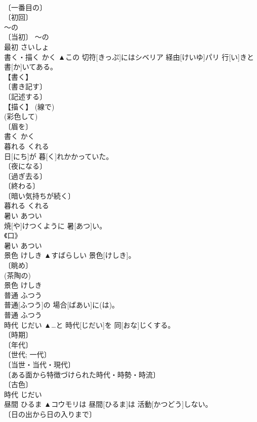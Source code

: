 \documentclass[8pt]{extreport}
\begin{document}
\begin{CJK}{UTF8}{min}
\\	〔一番目の〕 
\\	〔初回〕 
\\	～の 
\\	〔当初〕 ～の 
\\	最初	さいしょ	
\\	書く・描く	かく	▲この 切符[きっぷ]にはシベリア 経由[けいゆ]パリ 行[い]きと 書[か]いてある。	
\\	【書く】 
\\	〔書き記す〕 
\\	〔記述する〕 
\\	【描く】 (線で) 
\\	(彩色して) 
\\	〔眉を〕 
\\	書く	かく	
\\	暮れる	くれる	
\\	日[にち]が 暮[く]れかかっていた。	
\\	〔夜になる〕 
\\	〔過ぎ去る〕 
\\	〔終わる〕 
\\	〔暗い気持ちが続く〕 
\\	暮れる	くれる	
\\	暑い	あつい	
\\	焼[や]けつくように 暑[あつ]い。	
\\	《口》 
\\	暑い	あつい	
\\	景色	けしき	▲すばらしい 景色[けしき]。	
\\	〔眺め〕 
\\	(茶陶の) 
\\	景色	けしき	
\\	普通	ふつう	
\\	普通[ふつう]の 場合[ばあい]に(は)。	
\\	普通	ふつう	
\\	時代	じだい	▲…と 時代[じだい]を 同[おな]じくする。	
\\	〔時期〕 
\\	〔年代〕 
\\	〔世代; 一代〕 
\\	〔当世・当代・現代〕 
\\	〔ある面から特徴づけられた時代・時勢・時流〕 
\\	〔古色〕 
\\	時代	じだい	
\\	昼間	ひるま	▲コウモリは 昼間[ひるま]は 活動[かつどう]しない。	
\\	〔日の出から日の入りまで〕 

\end{CJK}
\end{document}
